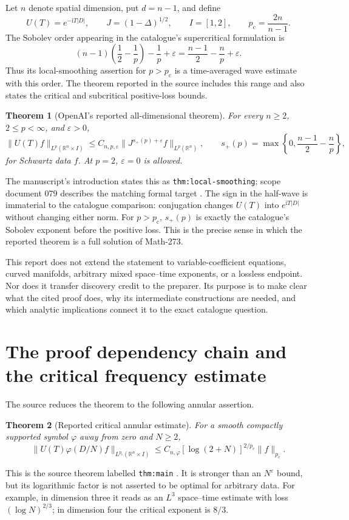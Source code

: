 \documentclass[11pt,a4paper]{article}
\numberwithin{equation}{section}
\newtheorem{theorem}{Theorem}[section]
\theoremstyle{definition}
\theoremstyle{remark}
\newcommand{\R}{\mathbb R}
\newcommand{\eps}{\varepsilon}
\newcommand{\pc}{p_{\mathrm c}}
\begin{document}
Let $n$ denote spatial dimension, put $d=n-1$, and define
\[
 U(T)=e^{-\mathrm iT|D|},\qquad J=(1-\Delta)^{1/2},\qquad
 I=[1,2],\qquad \pc=\frac{2n}{n-1}.
\]
The Sobolev order appearing in the catalogue's supercritical formulation is
\[
 (n-1)\left(\frac12-\frac1p\right)-\frac1p+\eps
       =\frac{n-1}{2}-\frac np+\eps.
\]
Thus its local-smoothing assertion for $p>\pc$ is a time-averaged wave estimate
with this order. The theorem reported in the source includes this range and
also states the critical and subcritical positive-loss bounds.

\begin{theorem}[OpenAI's reported all-dimensional theorem]\label{thm:main}
For every $n\ge2$, $2\le p<\infty$, and $\eps>0$,
\begin{equation}\label{eq:main}
 \|U(T)f\|_{L^p(\R^n\times I)}
 \le C_{n,p,\eps}\|J^{s_+(p)+\eps}f\|_{L^p(\R^n)},\qquad
 s_+(p)=\max\left\{0,\frac{n-1}{2}-\frac np\right\},
\end{equation}
for Schwartz data $f$. At $p=2$, $\eps=0$ is allowed.
\end{theorem}
The manuscript's introduction states this as
\texttt{thm:local-smoothing}; scope document 079 describes the matching
formal target \cite{intro,scope}. The sign in the half-wave is immaterial to
the catalogue comparison: conjugation changes $U(T)$ into $e^{\mathrm iT|D|}$
without changing either norm. For $p>\pc$, $s_+(p)$ is exactly the catalogue's
Sobolev exponent before the positive loss. This is the precise sense in which
the reported theorem is a full solution of Math-273.

This report does not extend the statement to variable-coefficient equations,
curved manifolds, arbitrary mixed space--time exponents, or a lossless endpoint.
Nor does it transfer discovery credit to the preparer. Its purpose is to make
clear what the cited proof does, why its intermediate constructions are needed,
and which analytic implications connect it to the exact catalogue question.

\section{The proof dependency chain and the critical frequency estimate}
\label{sec:roadmap}
The source reduces the theorem to the following annular assertion.
\begin{theorem}[Reported critical annular estimate]\label{thm:annular}
For a smooth compactly supported symbol $\varphi$ away from zero and $N\ge2$,
\begin{equation}\label{eq:annular}
 \|U(T)\varphi(D/N)f\|_{L^{\pc}(\R^n\times I)}
 \le C_{n,\varphi}[\log(2+N)]^{2/\pc}\|f\|_{\pc}.
\end{equation}
\end{theorem}
This is the source theorem labelled \texttt{thm:main} \cite{intro}. It is
stronger than an $N^\eps$ bound, but its logarithmic factor is not asserted to
be optimal for arbitrary data. For example, in dimension three it reads as an
$L^3$ space--time estimate with loss $(\log N)^{2/3}$; in dimension four the
critical exponent is $8/3$.
\end{document}
